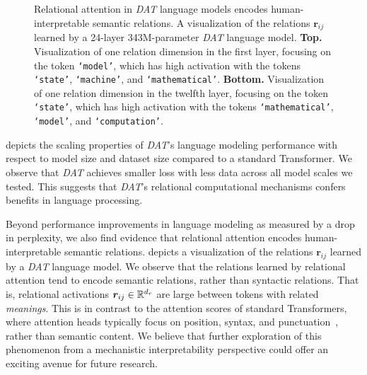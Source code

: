 \begin{figure}[t]
\begin{subfigure}[t]{\textwidth}
    \end{subfigure}
    \caption{Relational attention in \textit{DAT} language models encodes human-interpretable semantic relations. A visualization of the relations $\boldsymbol{r}_{ij}$ learned by a 24-layer 343M-parameter \textit{DAT} language model. \textbf{Top.} Visualization of one relation dimension in the first layer, focusing on the token \texttt{`model'}, which has high activation with the tokens \texttt{`state'}, \texttt{`machine'}, and \texttt{`mathematical'}. \textbf{Bottom.} Visualization of one relation dimension in the twelfth layer, focusing on the token \texttt{`state'}, which has high activation with the tokens \texttt{`mathematical'}, \texttt{`model'}, and \texttt{`computation'}.}\label{fig:datlm_viz}
\end{figure}

 depicts the scaling properties of \textit{DAT}'s language modeling performance with respect to model size and dataset size compared to a standard Transformer. We observe that \textit{DAT} achieves smaller loss with less data across all model scales we tested. This suggests that \textit{DAT}'s relational computational mechanisms confers benefits in language processing.

Beyond performance improvements in language modeling as measured by a drop in perplexity, we also find evidence that relational attention encodes human-interpretable semantic relations.  depicts a visualization of the relations $\boldsymbol{r}_{ij}$ learned by a \textit{DAT} language model. We observe that the relations learned by relational attention tend to encode semantic relations, rather than syntactic relations. That is, relational activations $\boldsymbol{r}_{ij} \in \mathbb{R}^{d_r}$ are large between tokens with related \textit{meanings}. This is in contrast to the attention scores of standard Transformers, where attention heads typically focus on position, syntax, and punctuation~\citep{clark2019doesbertlookat,htut2019attentionheadsberttrack,elhage2021mathematical}, rather than semantic content. We believe that further exploration of this phenomenon from a mechanistic interpretability perspective could offer an exciting avenue for future research.



